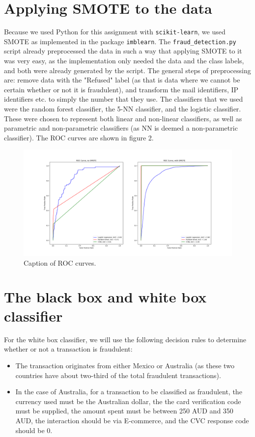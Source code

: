 \documentclass[]{article}
\begin{document}
\section{Applying SMOTE to the data}
Because we used Python for this assignment with \texttt{scikit-learn}, we used SMOTE as implemented in the package \texttt{imblearn}. The \texttt{fraud\_detection.py} script already preprocessed the data in such a way that applying SMOTE to it was very easy, as the implementation only needed the data and the class labels, and both were already generated by the script. The general steps of preprocessing are: remove data with the "Refused" label (as that is data where we cannot be certain whether or not it is fraudulent), and transform the mail identifiers, IP identifiers etc. to simply the number that they use. The classifiers that we used were the random forest classifier, the 5-NN classifier, and the logistic classifier. These were chosen to represent both linear and non-linear classifiers, as well as parametric and non-parametric classifiers (as NN is deemed a non-parametric classifier). The ROC curves are shown in figure 2.
\begin{figure}[h!]
	\centering
	\includegraphics[scale = 0.3]{Visualizations/ROC_curves}
	\caption{Caption of ROC curves.}
\end{figure}
\clearpage
\section{The black box and white box classifier}
For the white box classifier, we will use the following decision rules to determine whether or not a transaction is fraudulent:
\begin{itemize}
	\item The transaction originates from either Mexico or Australia (as these two countries have about two-third of the total fraudulent transactions).
	\item In the case of Australia, for a transaction to be classified as fraudulent, the currency used must be the Australian dollar, the the card verification code must be supplied, the amount spent must be between 250 AUD and 350 AUD, the interaction should be via E-commerce, and the CVC response code should be 0.
\end{itemize}
\end{document}
